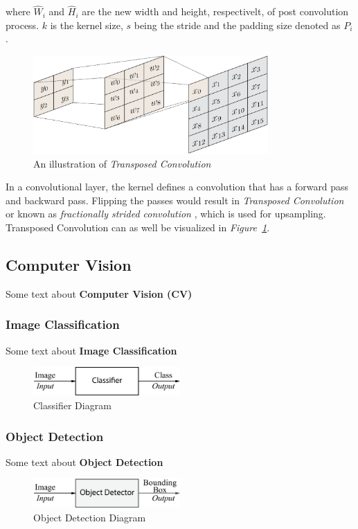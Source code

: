 \documentclass[12pt]{extarticle}
\begin{document}
	where $\hat{W}_i$ and $\hat{H}_i$ are the new width and height, respectivelt, of post convolution process. $k$ is the kernel size, $s$ being the stride and the padding size denoted as $P_i$. 
	
	\begin{figure}[h]
		\centering
		\includegraphics[width=0.8\textwidth]{pics/Figures/reverse_convolution.png}
		\caption{\small{An illustration of \emph{Transposed Convolution}}}
		\label{fig:T_Conv}
	\end{figure}
	
	In a convolutional layer, the kernel defines a convolution that has a forward pass and backward pass. Flipping the passes would result in \emph{Transposed Convolution} or known as \emph{fractionally strided convolution} \cite{stride}, which is used for upsampling. Transposed Convolution can as well be visualized in \emph{Figure~\ref{fig:T_Conv}}.
	
	\subsection{Computer Vision}\label{CV}
	Some text about \textbf{Computer Vision (CV)}
	\subsubsection{Image Classification}\label{Classification}
	Some text about \textbf{Image Classification}
	\begin{figure}[h]
		\centering
		\includegraphics[width=0.5\textwidth]{pics/Figures/Classifier_Block_Diagram.eps}
		\caption{\small{Classifier Diagram}}
		\label{fig:Classifier}
	\end{figure}
	\subsubsection{Object Detection}\label{Obj Detection}
	Some text about \textbf{Object Detection}\\
	\begin{figure}[h]
		\centering
		\includegraphics[width=0.5\textwidth]{pics/Figures/Obj_Det_Block_Diagram.eps}
		\caption{\small{Object Detection Diagram}}
		\label{fig:Obj Detector}
	\end{figure}
	
\end{document}
